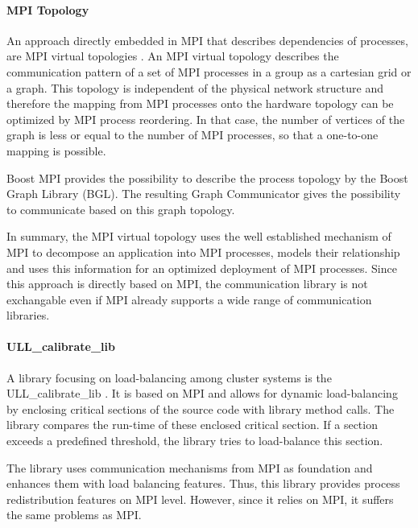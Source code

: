 \paragraph*{MPI Topology}
An approach directly embedded in MPI that describes dependencies of
processes, are MPI virtual topologies \cite{ref:mpi_topology}. An MPI
virtual topology describes the communication pattern of a set of MPI
processes in a group as a cartesian grid or a graph.  This topology is
independent of the physical network structure and therefore the
mapping from MPI processes onto the hardware topology can be optimized
by MPI process reordering. In that case, the number of vertices of the
graph is less or equal to the number of MPI processes, so that a
one-to-one mapping is possible.

Boost MPI provides the possibility to describe the process topology by
the Boost Graph Library (BGL)\cite{ref:boost_bgl}.  The resulting
Graph Communicator \cite{ref:boost_graph_communicator} gives the
possibility to communicate based on this graph topology.

In summary, the MPI virtual topology uses the well established
mechanism of MPI to decompose an application into MPI processes,
models their relationship and uses this information for an optimized
deployment of MPI processes.  Since this approach is directly based on
MPI, the communication library is not exchangable even if MPI already
supports a wide range of communication libraries.


\paragraph*{ULL\_calibrate\_lib}
A library focusing on load-balancing among cluster systems is the
ULL\_calibrate\_lib \cite{ref:ull_calibrate_lib}. It is based on MPI
and allows for dynamic load-balancing by enclosing critical sections
of the source code with library method calls. The library compares the
run-time of these enclosed critical section. If a section exceeds a
predefined threshold, the library tries to load-balance this section.

The library uses communication mechanisms from MPI as foundation and
enhances them with load balancing features. Thus, this library
provides process redistribution features on MPI level. However, since
it relies on MPI, it suffers the same problems as MPI.


